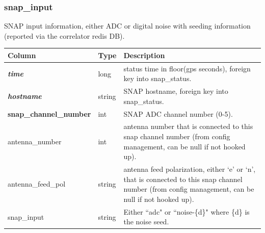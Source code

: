 \documentclass{article}
\begin{document}
{\subsubsection{snap\_input}
SNAP input information, either ADC or digital noise with seeding information (reported via the correlator redis DB).
\begin{center}
 \begin{tabular}{| p{4cm} | p{2cm} | p{10cm} |}
\hline
 {\bf Column} & {\bf Type}  & {\bf Description} \\ [0.5ex]  \hline\hline
\textbf{\textit{time}} & long & status time in floor(gps seconds), foreign key into snap\_status. \\ \hline
\textbf{\textit{hostname}} & string & SNAP hostname, foreign key into snap\_status. \\ \hline
\textbf{snap\_channel\_number} & int & SNAP ADC channel number (0-5). \\ \hline
antenna\_number & int & antenna number that is connected to this snap channel number (from config management, can be null if not hooked up). \\ \hline
antenna\_feed\_pol & string & antenna feed polarization, either `e' or `n', that is connected to this snap channel number (from config management, can be null if not hooked up). \\ \hline
snap\_input & string & Either ``adc" or ``noise-\{d\}" where \{d\} is the noise seed. \\ \hline
\end{tabular}
\end{center}




}
\end{document}

